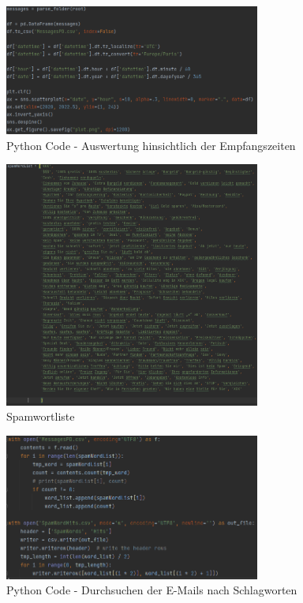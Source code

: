 \begin{figure}[!ht]
    \centering
    \includegraphics[width=0.75\textwidth]{images/Auswertung_Zeiten.PNG}
    \caption{Python Code - Auswertung hinsichtlich der Empfangszeiten} 
    \label{fig:emailsdatetime}
\end{figure}

\begin{figure}[!ht]
    \centering
    \includegraphics[width=0.75\textwidth]{images/Spamwortliste.PNG}
    \caption{Spamwortliste} 
    \label{fig:spamwortliste}
\end{figure}

\begin{figure}[!ht]
    \centering
    \includegraphics[width=0.75\textwidth]{images/python_Spamwordsearch.PNG}
    \caption{Python Code - Durchsuchen der E-Mails nach Schlagworten} 
    \label{fig:spamwordsearch}
\end{figure}


\newpage
\clearpage